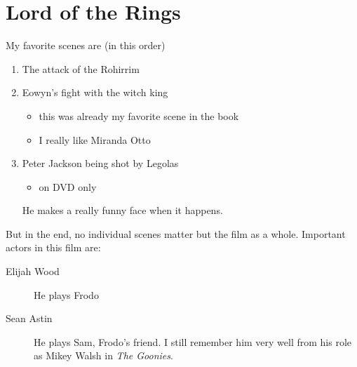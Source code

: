 \documentclass[11pt]{article}
\author{tjjang}
\date{\today}
\title{}
\begin{document}
\tableofcontents


\section{Lord of the Rings}
\label{sec:org05486bb}
My favorite scenes are (in this order)
\begin{enumerate}
\item The attack of the Rohirrim
\item Eowyn's fight with the witch king
\begin{itemize}
\item this was already my favorite scene in the book
\item I really like Miranda Otto
\end{itemize}
\item Peter Jackson being shot by Legolas
\begin{itemize}
\item on DVD only
\end{itemize}
He makes a really funny face when it happens.
\end{enumerate}
But in the end, no individual scenes matter but the film as a whole.
Important actors in this film are:
\begin{description}
\item[{Elijah Wood}] He plays Frodo
\item[{Sean Astin}] He plays Sam, Frodo's friend. I still remember him very well from his role as Mikey Walsh in \emph{The Goonies}.
\end{description}
\end{document}
